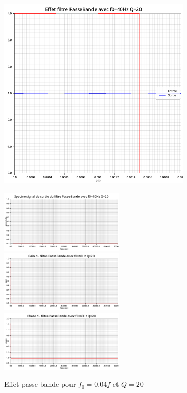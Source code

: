 \documentclass{article}
\begin{document}
\begin{figure}[H]
  \begin{minipage}{0.6\textwidth}
      \centering
      \includegraphics[width=25em]{images/creneau/bande/q=20/0.04/signals.png}
  \end{minipage}
  \begin{minipage}{0.3\textwidth}
      \centering
      \includegraphics[width=16em]{images/creneau/bande/q=20/0.04/fft_out.png}
      \vfill
      \includegraphics[width=16em]{images/creneau/bande/q=20/0.04/gain.png}
      \vfill
      \includegraphics[width=16em]{images/creneau/bande/q=20/0.04/phase.png}
  \end{minipage}
  \caption{Effet passe bande pour $f_0=0.04f$ et $Q=20$}
\end{figure}
\end{document}
